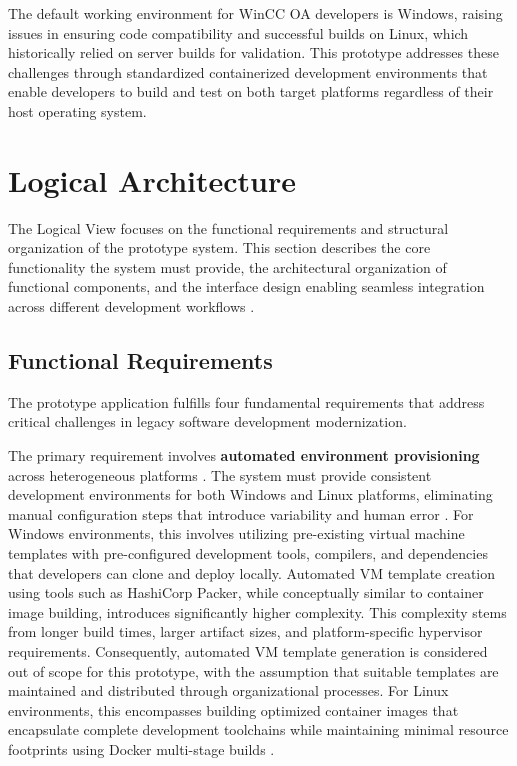The default working environment for WinCC OA developers is Windows, raising issues in ensuring code compatibility and successful builds on Linux, which historically relied on server builds for validation.
This prototype addresses these challenges through standardized containerized development environments that enable developers to build and test on both target platforms regardless of their host operating system.

\section{Logical Architecture}

The Logical View focuses on the functional requirements and structural organization of the prototype system.
This section describes the core functionality the system must provide, the architectural organization of functional components, and the interface design enabling seamless integration across different development workflows \citep{kruchten4+1ViewModel1995}.

\subsection{Functional Requirements}

The prototype application fulfills four fundamental requirements that address critical challenges in legacy software development modernization.

The primary requirement involves \textbf{automated environment provisioning} across heterogeneous platforms \citep{boettigerIntroductionDockerReproducible2015}.
The system must provide consistent development environments for both Windows and Linux platforms, eliminating manual configuration steps that introduce variability and human error \citep{hungGUIdockUsingDocker2016}.
For Windows environments, this involves utilizing pre-existing virtual machine templates with pre-configured development tools, compilers, and dependencies that developers can clone and deploy locally.
Automated VM template creation using tools such as HashiCorp Packer, while conceptually similar to container image building, introduces significantly higher complexity.
This complexity stems from longer build times, larger artifact sizes, and platform-specific hypervisor requirements.
Consequently, automated VM template generation is considered out of scope for this prototype, with the assumption that suitable templates are maintained and distributed through organizational processes.
For Linux environments, this encompasses building optimized container images that encapsulate complete development toolchains while maintaining minimal resource footprints using Docker multi-stage builds \citep{merkelDockerLightweightLinux2014}.

